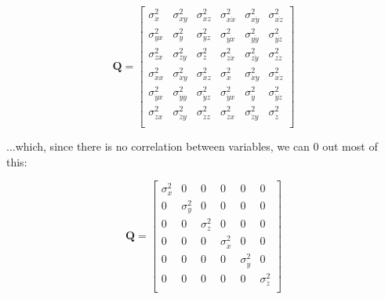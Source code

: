 \documentclass{article}
\begin{document}
\begin{equation}
    \textbf{Q} = \begin{bmatrix}
        \sigma_x^2          & \sigma_{xy}^2       & \sigma_{xz}^2       & \sigma_{x\dot{x}}^2 & \sigma_{x\dot{y}}^2       & \sigma_{x\dot{z}}^2       \\
        \sigma_{yx}^2       & \sigma_y^2          & \sigma_{yz}^2       & \sigma_{y\dot{x}}^2 & \sigma_{y\dot{y}}^2       & \sigma_{y\dot{z}}^2       \\
        \sigma_{zx}^2       & \sigma_{zy}^2       & \sigma_z^2          & \sigma_{z\dot{x}}^2 & \sigma_{z\dot{y}}^2       & \sigma_{z\dot{z}}^2       \\
        \sigma_{\dot{x}x}^2 & \sigma_{\dot{x}y}^2 & \sigma_{\dot{x}z}^2 & \sigma_{\dot{x}}^2  & \sigma_{\dot{x}\dot{y}}^2 & \sigma_{\dot{x}\dot{z}}^2 \\
        \sigma_{\dot{y}x}^2 & \sigma_{\dot{y}y}^2 & \sigma_{\dot{y}z}^2 & \sigma_{\dot{y}x}^2 & \sigma_{\dot{y}}^2        & \sigma_{\dot{y}\dot{z}}^2 \\
        \sigma_{\dot{z}x}^2 & \sigma_{\dot{z}y}^2 & \sigma_{\dot{z}z}^2 & \sigma_{\dot{z}x}^2 & \sigma_{\dot{z}y}^2       & \sigma_{\dot{z}}^2        \\
    \end{bmatrix}
\end{equation}

...which, since there is no correlation between variables, we can 0 out most of this:

\begin{equation}
    \textbf{Q} = \begin{bmatrix}
        \sigma_x^2 & 0          & 0          & 0                  & 0                  & 0                  \\
        0          & \sigma_y^2 & 0          & 0                  & 0                  & 0                  \\
        0          & 0          & \sigma_z^2 & 0                  & 0                  & 0                  \\
        0          & 0          & 0          & \sigma_{\dot{x}}^2 & 0                  & 0                  \\
        0          & 0          & 0          & 0                  & \sigma_{\dot{y}}^2 & 0                  \\
        0          & 0          & 0          & 0                  & 0                  & \sigma_{\dot{z}}^2 \\
    \end{bmatrix}
\end{equation}
\end{document}
